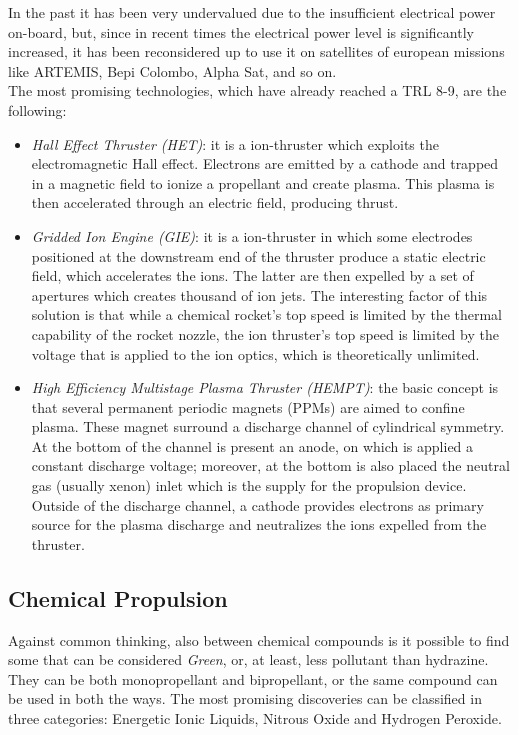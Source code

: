 \documentclass[a4paper]{report}
\begin{document}
In the past it has been very undervalued due to the insufficient electrical power on-board, but, since in recent times the electrical power level is significantly increased, it has been reconsidered up to use it on satellites of european missions like ARTEMIS, Bepi Colombo, Alpha Sat, and so on. \\
The most promising technologies, which have already reached a TRL 8-9, are the following:
\begin{itemize}
\item \textit{Hall Effect Thruster (HET)}: it is a ion-thruster which exploits the electromagnetic Hall effect. Electrons are emitted by a cathode and trapped in a magnetic field to ionize a propellant and create plasma. This plasma is then accelerated through an electric field, producing thrust. %
\item \textit{Gridded Ion Engine (GIE)}: it is a ion-thruster in which some electrodes positioned at the downstream end of the thruster produce a static electric field, which accelerates the ions. The latter are then expelled by a set of apertures which creates thousand of ion jets. The interesting factor of this solution is that while a chemical rocket's top speed is limited by the thermal capability of the rocket nozzle, the ion thruster's top speed is limited by the voltage that is applied to the ion optics, which is theoretically unlimited. %
\item\textit{High Efficiency Multistage Plasma Thruster (HEMPT)}: the basic concept is that several permanent periodic magnets (PPMs) are aimed to confine plasma. These magnet surround a discharge channel of cylindrical symmetry. At the bottom of the channel is present an anode, on which is applied a constant discharge voltage; moreover, at the bottom is also placed the neutral gas (usually xenon) inlet which is the supply for the propulsion device. Outside of the discharge channel, a cathode provides electrons as primary source for the plasma discharge and neutralizes the ions expelled from the thruster. %
\end{itemize}

\subsection{Chemical Propulsion}

Against common thinking, also between chemical compounds is it possible to find some that can be considered \textit{Green}, or, at least, less pollutant than hydrazine. They can be both monopropellant and bipropellant, or the same compound can be used in both the ways. The most promising discoveries can be classified in three categories: Energetic Ionic Liquids, Nitrous Oxide and Hydrogen Peroxide. 
\end{document}
